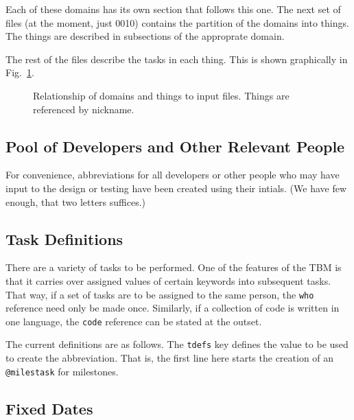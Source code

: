 Each of these domains has its own section that follows this one.
The next set of files (at the moment, just 0010) contains the partition
of the domains into things.  The things are described in subsections of
the approprate domain.

The rest of the files describe the tasks in each thing.  This is shown
graphically in Fig.~\ref{fig:umlclass}.
\begin{figure}[h!]%
\captionsetup{width=0.6\linewidth}
\caption[Input Files]{Relationship of domains and things to input files.
Things are referenced by nickname.}
\label{fig:umlclass}
\end{figure}

\subsection{Pool of Developers and Other Relevant People}

For convenience, abbreviations for all developers or other people who
may have input to the design or testing have been created using their
intials.   (We have few enough, that two letters suffices.)


\subsection{Task Definitions}

There are a variety of tasks to be performed.  One of the features
of the \ac{TBM} is that it carries over assigned values of certain
keywords into subsequent tasks.  That way, if a set of tasks are to
be assigned to the same person, the \texttt{who} reference need only
be made once.  Similarly, if a collection of code is written in one
language, the \texttt{code} reference can be stated at the outset.

The current definitions are as follows.  The \texttt{tdefs} key
defines the value to be used to create the abbreviation.  That is,
the first line here starts the creation of an \texttt{@milestask}
for milestones.


\subsection{Fixed Dates}


